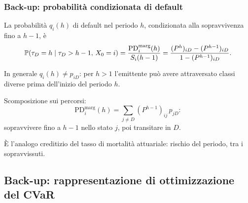 \begin{frame}%
%

\frametitle{Back-up: probabilit\`{a} condizionata di default}%
%

%


La probabilit\`{a} $q_{i}(h)$ di default nel periodo $h$, condizionata alla
sopravvivenza fino a $h-1$, \`{e}
\[
\Prob(\tau_{D}=h\mid\tau_{D}>h-1,\,X_{0}=i) = \frac{\mathrm{PD}_{i}%
^{\mathrm{marg}}(h)}{S_{i}(h-1)} = \frac{(P^{h})_{iD}-(P^{h-1})_{iD}%
}{1-(P^{h-1})_{iD}}.
\]


\medskip

\begin{stepitemize}
\item In generale $q_{i}(h)\neq p_{iD}$: per $h>1$ l'emittente pu\`{o} avere
attraversato classi diverse prima dell'inizio del periodo $h$.

\item Scomposizione sui percorsi:
\[
\mathrm{PD}_{i}^{\mathrm{marg}}(h) = \sum_{j\neq D} (P^{h-1})_{ij}\,p_{jD}:
\]
sopravvivere fino a $h-1$ nello stato $j$, poi transitare in $D$.

\item \`{E} l'analogo creditizio del tasso di mortalit\`{a} attuariale:
rischio del periodo, tra i sopravvissuti.
\end{stepitemize}

%

\transboxout
\end{frame}%






\subsection{Back-up: rappresentazione di ottimizzazione del CVaR}%

